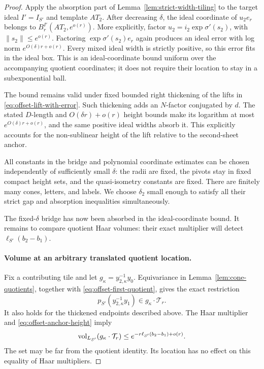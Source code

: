 \begin{proof}
Apply the absorption part of Lemma~\ref{lem:strict-width-tiling} to the
target ideal $I'=I_{S'}$ and template $AT_2$.  After decreasing $\delta$,
the ideal coordinate of $u_2e_r$ belongs to
$B^{I'}_r(AT_2,e^{o(r)})$.  More explicitly, factor
$u_2=i_2\exp\sigma'(s_2)$, with $\|s_2\|\le e^{o(r)}$.
Factoring $\exp\sigma'(s_2)e_r$ again produces an ideal error with log
norm $e^{O(\delta)r+o(r)}$.  Every mixed ideal width is strictly positive,
so this error fits in the ideal box.  This is an ideal-coordinate bound
uniform over the accompanying quotient coordinates; it does not require
their location to stay in a subexponential ball.

The bound remains valid under fixed bounded right thickening of the
lifts in \eqref{eq:offset-lift-with-error}.  Such thickening adds an
$N$-factor conjugated by $d$.  The stated $D$-length and
$O(\delta r)+o(r)$ height bounds make its logarithm at most
$e^{O(\delta)r+o(r)}$, and the same positive ideal widths absorb it.
This explicitly accounts for the non-sublinear height of the lift
relative to the second-sheet anchor.

All constants in the bridge and polynomial coordinate estimates can be
chosen independently of sufficiently small $\delta$: the radii are fixed,
the pivots stay in fixed compact height sets, and the quasi-isometry
constants are fixed.  There are finitely many cones, letters, and labels.
We choose $\delta_2$ small enough to satisfy all their strict gap and
absorption inequalities simultaneously.

The fixed-$\delta$ bridge has now been absorbed in the ideal-coordinate
bound.  It remains to compare quotient Haar volumes: their exact
multiplier will detect $\ell_{S'}(b_2-b_1)$.

\paragraph{Volume at an arbitrary translated quotient location.}
Fix a contributing tile and let $g_\kappa=y_{2,\kappa}^{-1}y_0$.  Equivariance in
Lemma~\ref{lem:cone-quotients}, together with
\eqref{eq:offset-first-quotient}, gives the exact restriction
\begin{equation}
 p_{S'}(y_{2,\kappa}^{-1}y_1)\in g_\kappa\cdot \mathcal T_r.
 \label{eq:offset-translated-quotient}
\end{equation}
It also holds for the thickened endpoints described above.  The Haar
multiplier and \eqref{eq:offset-anchor-height} imply
\begin{equation}
 \operatorname{vol}_{L_{S'}}(g_\kappa\cdot \mathcal T_r)
 \le e^{-r\ell_{S'}(b_2-b_1)+o(r)}.
 \label{eq:offset-quotient-volume}
\end{equation}
The set may be far from the quotient identity.  Its location has no
effect on this equality of Haar multipliers.


\end{proof}
